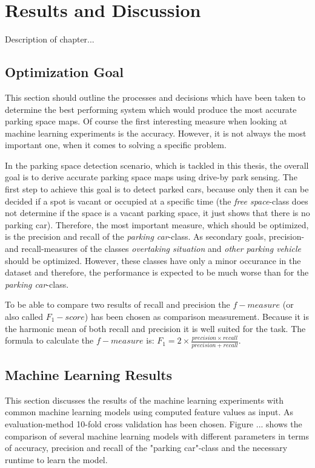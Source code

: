 \chapter{Results and Discussion}
\label{chap:evaluation}

Description of chapter...

\section{Optimization Goal}

This section should outline the processes and decisions which have been taken to determine the best performing system which would produce the most accurate parking space maps. Of course the first interesting measure when looking at machine learning experiments is the accuracy. However, it is not always the most important one, when it comes to solving a specific problem. 

In the parking space detection scenario, which is tackled in this thesis, the overall goal is to derive accurate parking space maps using drive-by park sensing. The first step to achieve this goal is to detect parked cars, because only then it can be decided if a spot is vacant or occupied at a specific time (the \emph{free space}-class does not determine if the space is a vacant parking space, it just shows that there is no parking car). Therefore, the most important measure, which should be optimized, is the precision and recall of the \emph{parking car}-class. As secondary goals, precision- and recall-measures of the classes \emph{overtaking situation} and \emph{other parking vehicle} should be optimized. However, these classes have only a minor occurance in the dataset and therefore, the performance is expected to be much worse than for the \emph{parking car}-class.

To be able to compare two results of recall and precision the $f-measure$ (or also called $F_1-score$) has been chosen as comparison measurement. Because it is the harmonic mean of both recall and precision it is well suited for the task. The formula to calculate the $f-measure$ is: $F_1 = 2 \times \frac{precision \times recall}{precision + recall}$.


\section{Machine Learning Results}

This section discusses the results of the machine learning experiments with common machine learning models using computed feature values as input. As evaluation-method 10-fold cross validation has been chosen. Figure ... shows the comparison of several machine learning models with different parameters in terms of accuracy, precision and recall of the "parking car"-class and the necessary runtime to learn the model.


